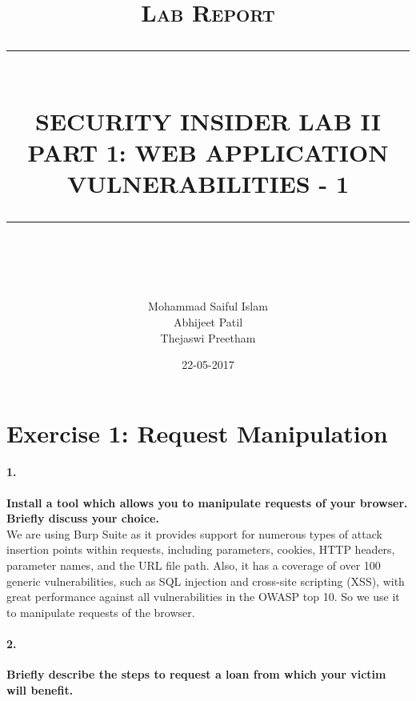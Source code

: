 \documentclass[12pt]{report}
\newcommand{\HRule}[1]{\rule{\linewidth}{#1}}
\begin{document}
	
	\title{ \normalsize \textsc{Lab Report}
			\\ [2.0cm]
			\HRule{0.5pt} \\
			\LARGE \textbf{\uppercase{Security Insider Lab II \\
			Part 1: Web Application Vulnerabilities - 1}}
			\HRule{2pt} \\ [0.5cm]
			\normalsize \vspace*{5\baselineskip}}
	\date{22-05-2017}
	\author{
			Mohammad Saiful Islam \\
			Abhijeet Patil \\
			Thejaswi Preetham}
	\maketitle
	\newpage
	
	
	
	
	\section*{Exercise 1: Request Manipulation}
	
	
	\paragraph*{1.} {\bf Install a tool which allows you to manipulate requests of your browser. Briefly discuss your choice.}\\ 
	We are using Burp Suite as it provides support for numerous types of attack insertion points within requests, including parameters, cookies, HTTP headers, parameter names, and the URL file path. Also, it has a  coverage of over 100 generic vulnerabilities, such as SQL injection and cross-site scripting (XSS), with great performance against all vulnerabilities in the OWASP top 10. So we use it to manipulate requests of the browser.
	
	\paragraph*{2.} {\bf Briefly describe the steps to request a loan from which your victim will benefit.}
	
\end{document}
